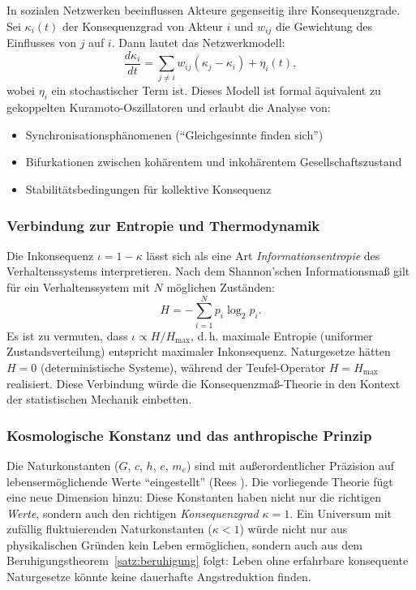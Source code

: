 ﻿\documentclass[a4paper,12pt]{article}
\theoremstyle{definition}
\begin{document}
In sozialen Netzwerken beeinflussen Akteure gegenseitig ihre Konsequenzgrade. Sei $\kappa_i(t)$ der Konsequenzgrad von Akteur $i$ und $w_{ij}$ die Gewichtung des Einflusses von $j$ auf $i$. Dann lautet das Netzwerkmodell:
\[
\frac{d\kappa_i}{dt} = \sum_{j \neq i} w_{ij} (\kappa_j - \kappa_i) + \eta_i(t),
\]
wobei $\eta_i$ ein stochastischer Term ist. Dieses Modell ist formal äquivalent zu gekoppelten Kuramoto-Oszillatoren \cite{kuramoto1984} und erlaubt die Analyse von:
\begin{itemize}
\item Synchronisationsphänomenen (``Gleichgesinnte finden sich'')
\item Bifurkationen zwischen kohärentem und inkohärentem Gesellschaftszustand
\item Stabilitätsbedingungen für kollektive Konsequenz
\end{itemize}

\subsubsection{Verbindung zur Entropie und Thermodynamik}

Die Inkonsequenz $\iota = 1 - \kappa$ lässt sich als eine Art \emph{Informationsentropie} des Verhaltenssystems interpretieren. Nach dem Shannon'schen Informationsmaß gilt für ein Verhaltenssystem mit $N$ möglichen Zuständen:
\[
H = -\sum_{i=1}^{N} p_i \log_2 p_i.
\]
Es ist zu vermuten, dass $\iota \propto H / H_{\max}$, d.\,h. maximale Entropie (uniformer Zustandsverteilung) entspricht maximaler Inkonsequenz. Naturgesetze hätten $H = 0$ (deterministische Systeme), während der Teufel-Operator $H = H_{\max}$ realisiert. Diese Verbindung würde die Konsequenzmaß-Theorie in den Kontext der statistischen Mechanik einbetten.

\subsubsection{Kosmologische Konstanz und das anthropische Prinzip}

Die Naturkonstanten ($G$, $c$, $h$, $e$, $m_e$) sind mit außerordentlicher Präzision auf lebensermöglichende Werte ``eingestellt'' (Rees \cite{rees1999}). Die vorliegende Theorie fügt eine neue Dimension hinzu: Diese Konstanten haben nicht nur die richtigen \emph{Werte}, sondern auch den richtigen \emph{Konsequenzgrad} $\kappa = 1$. Ein Universum mit zufällig fluktuierenden Naturkonstanten ($\kappa < 1$) würde nicht nur aus physikalischen Gründen kein Leben ermöglichen, sondern auch aus dem Beruhigungstheorem~\ref{satz:beruhigung} folgt: Leben ohne erfahrbare konsequente Naturgesetze könnte keine dauerhafte Angstreduktion finden.
\end{document}
